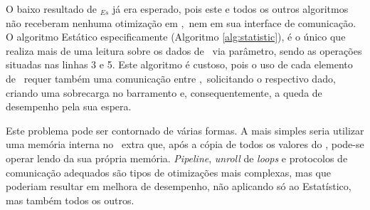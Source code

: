     
        O baixo resultado de \Ss$_{Es}$ já era esperado, pois este e todos os outros algoritmos não receberam nenhuma otimização em \hardware,\ nem em sua interface de comunicação.
        O algoritmo Estático especificamente (Algoritmo \ref{alg:statistic}), é o único que realiza mais de uma leitura sobre os dados de \buffer\ via parâmetro, sendo as operações situadas nas linhas 3 e 5.
        Este algoritmo é custoso, pois o uso de cada elemento de \buffer\ requer também uma comunicação entre \hs,\ solicitando o respectivo dado, criando uma sobrecarga no barramento e, consequentemente, a queda de desempenho pela sua espera.
        
        Este problema pode ser contornado de várias formas.
        A mais simples seria utilizar uma memória interna no \hardware\ extra que, após a cópia de todos os valores do \buffer, pode-se operar lendo da sua própria memória.
        \textit{Pipeline}, \textit{unroll} de \textit{loops} e protocolos de comunicação adequados são tipos de otimizações mais complexas, mas que poderiam resultar em melhora de desempenho, não aplicando só ao Estatístico, mas também todos os outros.
        

